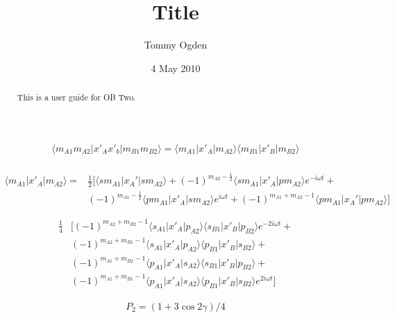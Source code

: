 \documentclass{tufte-handout}
\title{Title}
\author[tommyogden]{Tommy Ogden}
\date{4 May 2010}  %
\begin{document}
\maketitle%

\begin{abstract}
\noindent This is a user guide for OB Two.
\end{abstract}




\begin{align}
    \langle m_{A1} m_{A2} | x'_A x'_b | m_{B1} m_{B2} \rangle
    = \langle m_{A1} | x'_A | m_{A2} \rangle \langle m_{B1} | x'_B | m_{B2} \rangle \\
\end{align}



\begin{fullwidth}
\begin{align}
    \langle m_{A1} | x'_A | m_{A2} \rangle = & 
    \frac{1}{2} [ \langle sm_{A1} | x_A' | sm_{A2} \rangle + (-1)^{m_{A2}-\frac{1}{2}} \langle sm_{A1} | x'_A | pm_{A2} \rangle e^{-i \omega t} + \\
    & (-1)^{m_{A1}-\frac{1}{2}} \langle pm_{A1} | x'_A | sm_{A2} \rangle e^{i \omega t} + (-1)^{m_{A1} + m_{A2}-1} \langle pm_{A1} | x_A' | pm_{A2} \rangle ] 
\end{align}

\begin{align}
\frac{1}{4} & [ (-1)^{m_{A2} + m_{B2}-1} \langle s_{A1} | x'_A | p_{A2} \rangle \langle s_{B1} | x'_B | p_{B2} \rangle e^{-2i \omega t} + \\
& (-1)^{m_{A2} + m_{B1}-1} \langle s_{A1} | x'_A | p_{A2} \rangle \langle p_{B1} | x'_B | s_{B2} \rangle + \\
& (-1)^{m_{A1} + m_{B2}-1} \langle p_{A1} | x'_A | s_{A2} \rangle \langle s_{B1} | x'_B | p_{B2} \rangle + \\
& (-1)^{m_{A1} + m_{B1}-1} \langle p_{A1} | x'_A | s_{A2} \rangle \langle p_{B1} | x'_B | s_{B2} \rangle e^{2i \omega t} ] 
\end{align}

\begin{align}
    P_2 = (1 + 3 \cos{2 \gamma})/4
\end{align}

\end{fullwidth}
\end{document}
